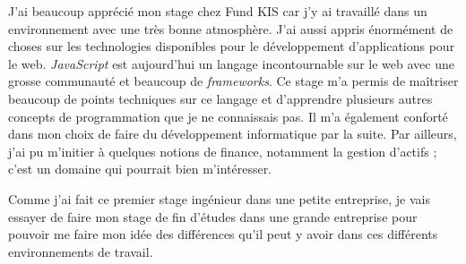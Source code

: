 J'ai beaucoup apprécié mon stage chez Fund KIS car j'y ai travaillé dans un environnement avec une très bonne atmosphère. J'ai aussi appris énormément de choses sur les technologies disponibles pour le développement d'applications pour le web. \textit{JavaScript} est aujourd'hui un langage incontournable sur le web avec une grosse communauté et beaucoup de \textit{frameworks}. Ce stage m'a permis de maîtriser beaucoup de points techniques sur ce langage et d'apprendre plusieurs autres concepts de programmation que je ne connaissais pas. Il m'a également conforté dans mon choix de faire du développement informatique par la suite. Par ailleurs, j'ai pu m'initier à quelques notions de finance, notamment la gestion d'actifs ; c'est un domaine qui pourrait bien m'intéresser.

\vspace{3mm}

Comme j'ai fait ce premier stage ingénieur dans une petite entreprise, je vais essayer de faire mon stage de fin d'études dans une grande entreprise pour pouvoir me faire mon idée des différences qu'il peut y avoir dans ces différents environnements de travail.
